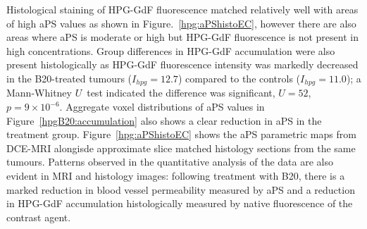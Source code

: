 Histological staining of \acs{HPG-GdF} fluorescence matched relatively well with areas of high \acs{aPS} values as shown in Figure.~\ref{hpg:aPShistoEC}, however there are also areas where aPS is moderate or high but \acs{HPG-GdF} fluorescence is not present in high concentrations. 
Group differences in \acs{HPG-GdF} accumulation were also present histologically as \acs{HPG-GdF} fluorescence intensity was markedly decreased in the B20-treated tumours ($I_{hpg} = 12.7$) compared to the controls ($I_{hpg} = 11.0$); a Mann-Whitney $U$~test indicated the difference was significant, $U = 52$, $p = 9\times10^{-6}$.
Aggregate voxel distributions of \acs{aPS} values in Figure~\ref{hpgB20:accumulation} also shows a clear reduction in \acs{aPS} in the treatment group. Figure~\ref{hpg:aPShistoEC} shows the \acs{aPS} parametric maps from \acs{DCE-MRI} alongisde approximate slice matched histology sections from the same tumours.
Patterns observed in the quantitative analysis of the data are also evident in MRI and histology images: following treatment with B20, there is a marked reduction in blood vessel permeability measured by \acs{aPS} and a reduction in \acs{HPG-GdF} accumulation histologically measured by native fluorescence of the contrast agent.

